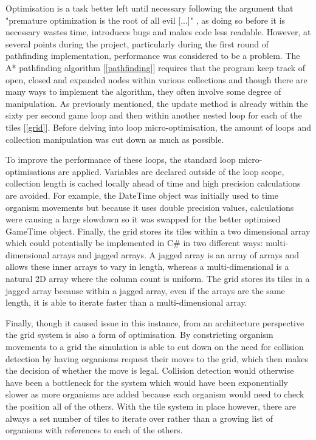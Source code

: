 \documentclass[a4paper, oneside, 11pt]{report}
\begin{document}
Optimisation is a task better left until necessary following the argument that "premature optimization is the root of all evil [...]" \cite{knuth}, as doing so before it is necessary wastes time, introduces bugs and makes code less readable. However, at several points during the project, particularly during the first round of pathfinding implementation, performance was considered to be a problem. The A* pathfinding algorithm [\ref{pathfinding}] requires that the program keep track of open, closed and expanded nodes within various collections and though there are many ways to implement the algorithm, they often involve some degree of manipulation. As previously mentioned, the update method is already within the sixty per second game loop and then within another nested loop for each of the tiles [\ref{grid}]. Before delving into loop micro-optimisation, the amount of loops and collection manipulation was cut down as much as possible.

To improve the performance of these loops, the standard loop micro-optimisations are applied. Variables are declared outside of the loop scope, collection length is cached locally ahead of time and high precision calculations are avoided. For example, the DateTime object was initially used to time organism movements but because it uses double precision values, calculations were causing a large slowdown so it was swapped for the better optimised GameTime object. Finally, the grid stores its tiles within a two dimensional array which could potentially be implemented in C\# in two different ways: multi-dimensional arrays and jagged arrays. A jagged array is an array of arrays and allows these inner arrays to vary in length, whereas a multi-dimensional is a natural 2D array where the column count is uniform. The grid stores its tiles in a jagged array because within a jagged array, even if the arrays are the same length, it is able to iterate faster than a multi-dimensional array.

Finally, though it caused issue in this instance, from an architecture perspective the grid system is also a form of optimisation. By constricting organism movements to a grid the simulation is able to cut down on the need for collision detection by having organisms request their moves to the grid, which then makes the decision of whether the move is legal. Collision detection would otherwise have been a bottleneck for the system which would have been exponentially slower as more organisms are added because each organism would need to check the position all of the others. With the tile system in place however, there are always a set number of tiles to iterate over rather than a growing list of organisms with references to each of the others.
\end{document}
